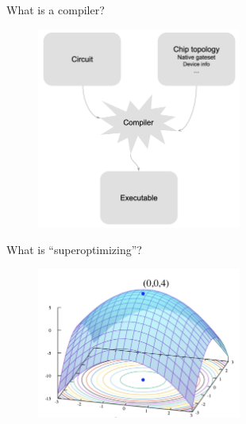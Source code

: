 \documentclass[11pt,aspectratio=1610,xcolor=dvipsnames]{beamer}
\begin{document}
\begin{frame}{What is a compiler?}
	\begin{figure}[h]
		\centering
		\includegraphics[width=0.6\textwidth]{compiler.png}
	\end{figure}
\end{frame}

\begin{frame}{What is ``superoptimizing''?}
	\begin{figure}[h]
		\centering
		\includegraphics[width=0.6\textwidth]{optim.png}
	\end{figure}
\end{frame}
\end{document}
